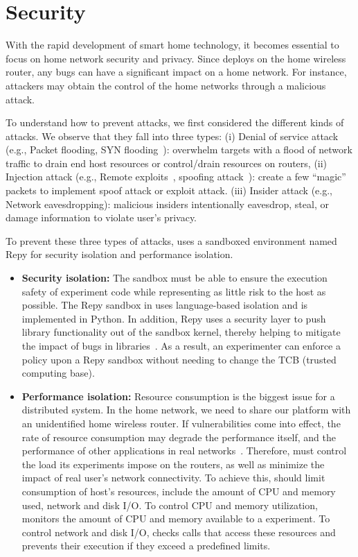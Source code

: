 \section{Security}
\label{sec.security}
With the rapid development of smart home technology, it becomes essential to focus on home network security and privacy. Since \sysname deploys on the home wireless router, any bugs can have a significant impact on a home network. For instance, attackers may obtain the control of the home networks through a malicious attack. 

To understand how to prevent attacks, we first considered the different kinds of attacks. We observe that they fall into three types: (i) Denial of service attack (e.g., Packet flooding, SYN flooding~\cite{eddy2011syn}): overwhelm targets with a flood of network traffic to drain end host resources or control/drain resources on routers, (ii) Injection attack (e.g., Remote exploits~\cite{shellcode},  spoofing attack~\cite{bishop1996attack}): create a few ``magic'' packets to implement spoof attack or exploit attack. (iii) Insider attack (e.g., Network eavesdropping): malicious insiders intentionally eavesdrop, steal, or damage information to violate user's privacy.

To prevent these three types of attacks, \sysname uses a sandboxed environment named Repy for security isolation and performance isolation.
 
\begin{itemize} 
\item \textbf{Security isolation:} The sandbox must be able to ensure the execution safety of experiment code while representing as little risk to the host as possible. The Repy sandbox in \sysname uses language-based isolation and is implemented in Python. In addition, Repy uses a security layer to push library functionality out of the sandbox kernel, thereby helping to mitigate the impact of bugs in libraries~\cite{cappos2010retaining}. As a result, an experimenter can enforce a policy upon a Repy sandbox without needing to change the TCB (trusted computing base).  
\item \textbf{Performance isolation:} Resource consumption is the biggest issue for a distributed system. In the home network, we need to share our platform with an unidentified home wireless router. If vulnerabilities come into effect\cite{joshi2013survey}, the rate of resource consumption may degrade the performance itself, and the performance of other applications in real networks~\cite{joshi2013survey}. Therefore, \sysname must control the load its experiments impose on the routers, as well as minimize the impact of real user's network connectivity. To achieve this, \sysname should limit consumption of host's resources, include the amount of CPU and memory used, network and disk I/O. To control CPU and memory utilization, \sysname monitors the amount of CPU and memory available to a experiment. To control network and disk I/O, \sysname checks calls that access these resources and prevents their execution if they exceed a predefined limits. 
\end{itemize}

